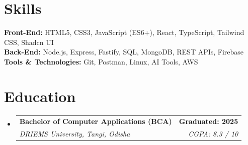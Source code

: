 \documentclass[letterpaper,11pt]{article}
\makeatletter
\newcommand{\resumeSubheading}[4]{
  \vspace{-2pt}\item
    \begin{tabular*}{1.0\textwidth}[t]{l@{\extracolsep{\fill}}r}
      \textbf{#1} & \textbf{\small #2} \\
      \textit{\small#3} & \textit{\small #4} \\
    \end{tabular*}\vspace{-6pt}
}
\newcommand{\resumeSubHeadingListStart}{\begin{itemize}[leftmargin=0.0in, label={}]}
\newcommand{\resumeSubHeadingListEnd}{\end{itemize}}
\makeatother
\begin{document}
\section{Skills}
\textbf{Front-End:} HTML5, CSS3, JavaScript (ES6+), React, TypeScript, Tailwind CSS, Shadcn UI  \\
\textbf{Back-End:} Node.js, Express, Fastify, SQL, MongoDB, REST APIs, Firebase \\
\textbf{Tools \& Technologies:} Git, Postman, Linux, AI Tools, AWS

\section{Education}
\resumeSubHeadingListStart
  \resumeSubheading
    {Bachelor of Computer Applications (BCA)}{Graduated: 2025}
    {DRIEMS University, Tangi, Odisha}{CGPA: 8.3 / 10}
\resumeSubHeadingListEnd
\end{document}
